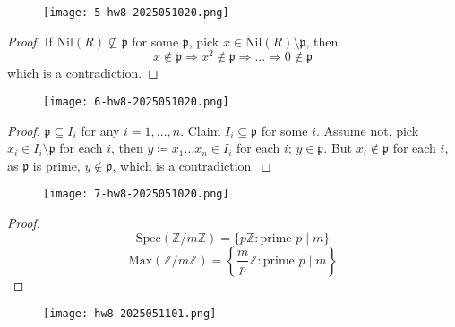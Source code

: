 \begin{exercise}
\begin{figure}[H]
\centering
\texttt{[image: 5-hw8-2025051020.png]}
\label{}
\end{figure}
\end{exercise}
\begin{proof}
If $\mathrm{Nil}(R)\not \subseteq \mathfrak{p}$ for some $\mathfrak{p}$, pick $x\in \mathrm{Nil}(R)\setminus \mathfrak{p}$, then
\[
x\not\in \mathfrak{p}\Rightarrow x^2\not\in \mathfrak{p}\Rightarrow\dots\Rightarrow0\not\in \mathfrak{p}
\]
which is a contradiction.
\end{proof}

\begin{exercise}
\begin{figure}[H]
\centering
\texttt{[image: 6-hw8-2025051020.png]}
\label{}
\end{figure}
\end{exercise}
\begin{proof}
$\mathfrak{p}\subseteq I_i$ for any $i=1,\dots,n$. Claim $I_i\subseteq \mathfrak{p}$ for some $i$. Assume not, pick $x_i\in I_i\setminus \mathfrak{p}$ for each $i$, then $y\coloneqq x_1\dots x_n\in I_i$ for each $i$; $y\in \mathfrak{p}$. But $x_i\not\in \mathfrak{p}$ for each $i$, as $\mathfrak{p}$ is prime, $y\not\in \mathfrak{p}$, which is a contradiction.
\end{proof}

\begin{exercise}
\begin{figure}[H]
\centering
\texttt{[image: 7-hw8-2025051020.png]}
\label{}
\end{figure}
\end{exercise}
\begin{proof}
\[
\mathrm{Spec}(\mathbb{Z}/m\mathbb{Z})=\{ p\mathbb{Z}:\text{prime }p\mid m \}
\]
\[
\mathrm{Max}(\mathbb{Z}/m\mathbb{Z})=\left\{  \frac{m}{p}\mathbb{Z}:\text{prime }p\mid m  \right\}
\]
\end{proof}

\begin{figure}[H]
\centering
\texttt{[image: hw8-2025051101.png]}
\label{}
\end{figure}

